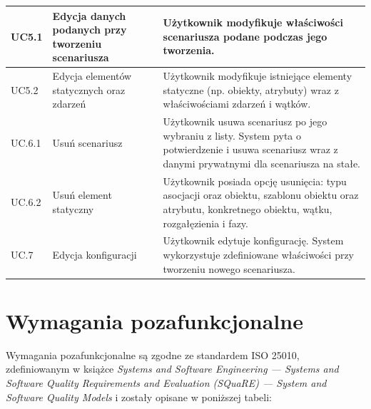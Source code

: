 {\begin{longtable}{|p{1cm}|p{4.5cm}|p{8cm}|}
    \hline
    UC5.1 & Edycja danych podanych przy tworzeniu scenariusza & Użytkownik modyfikuje właściwości scenariusza podane podczas jego tworzenia. \\
    \hline
    UC5.2 & Edycja elementów statycznych oraz zdarzeń & Użytkownik modyfikuje istniejące elementy statyczne (np. obiekty, atrybuty) wraz z właściwościami zdarzeń i wątków. \\
    \hline
    UC.6.1 & Usuń scenariusz & Użytkownik usuwa scenariusz po jego wybraniu z listy. System pyta o potwierdzenie i usuwa scenariusz wraz z danymi prywatnymi dla scenariusza na stałe. \\
    \hline
    UC.6.2 & Usuń element statyczny & Użytkownik posiada opcję usunięcia: typu asocjacji oraz obiektu, szablonu obiektu oraz atrybutu, konkretnego obiektu, wątku, rozgałęzienia i fazy.    \\
    \hline
    UC.7 & Edycja konfiguracji & Użytkownik edytuje konfigurację. System wykorzystuje zdefiniowane właściwości przy tworzeniu nowego scenariusza. \\
    \hline
\end{longtable}
}
\normalsize
\section{Wymagania pozafunkcjonalne}
Wymagania pozafunkcjonalne są zgodne ze standardem ISO 25010, zdefiniowanym w książce 
\emph{Systems and Software Engineering — Systems and Software Quality Requirements and Evaluation (SQuaRE) — System and Software Quality Models} 
\cite{iso25010} i zostały opisane w poniższej tabeli:

